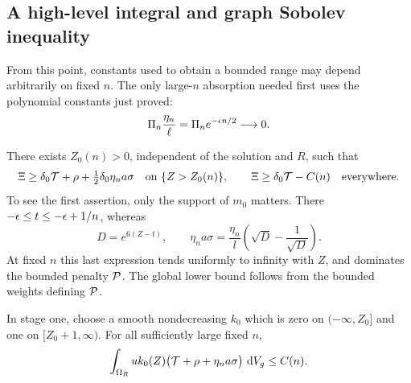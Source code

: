 \subsection{A high-level integral and graph Sobolev inequality}

From this point, constants used to obtain a bounded range may depend
arbitrarily on fixed $n$.  The only large-$n$ absorption needed first
uses the polynomial constants just proved:
\begin{equation}\label{four:bnd:small-boundary-factor}
 \Pi_n\frac{\eta_n}{\ell}
 =\Pi_n e^{-\epsilon n/2}\longrightarrow0.
\end{equation}

There exists $Z_0(n)>0$, independent of the solution and $R$, such
that
\begin{equation}\label{four:bnd:high-source}
 \Xi\ge\delta_0\mathcal T+\rho+\tfrac12\delta_0\eta_na\sigma
       \quad\text{on }\{Z>Z_0(n)\},
 \qquad \Xi\ge\delta_0\mathcal T-C(n)\quad\text{everywhere}.
\end{equation}
To see the first assertion, only the support of $m_0$ matters.
There $-\epsilon\le t\le-\epsilon+1/n$, whereas
\[
 D=e^{6(Z-t)},\qquad
 \eta_na\sigma=\frac{\eta_n}{l}
             \left(\sqrt D-\frac1{\sqrt D}\right).
\]
At fixed $n$ this last expression tends uniformly to infinity with
$Z$, and dominates the bounded penalty $\mathcal P$.  The global lower
bound follows from the bounded weights defining $\mathcal P$.

\begin{lemma}\label{four:bnd:high-level-integral}
In stage one, choose a smooth nondecreasing $k_0$ which is zero on
$(-\infty,Z_0]$ and one on $[Z_0+1,\infty)$.  For all sufficiently
large fixed $n$,
\begin{equation}\label{four:bnd:high-integral}
 \int_{\Omega_R}u k_0(Z)
       \bigl(\mathcal T+\rho+\eta_na\sigma\bigr)\,\,\mathrm d V_g\le C(n).
\end{equation}
\end{lemma}


